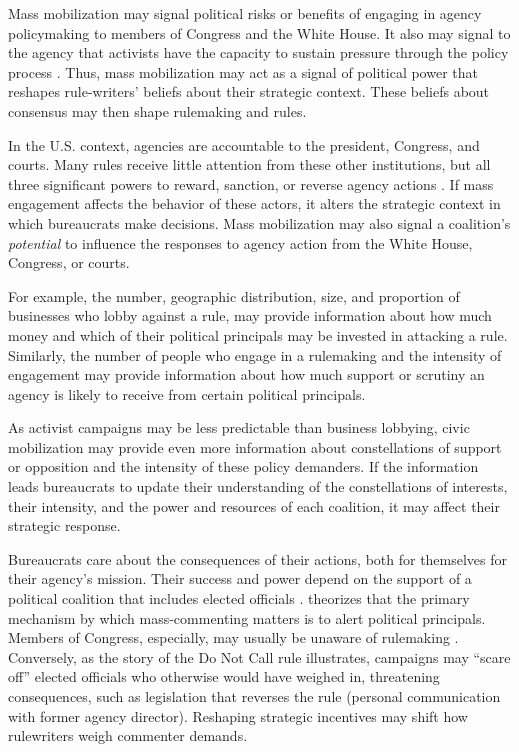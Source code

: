 Mass mobilization may signal political risks or benefits of engaging in agency policymaking to members of Congress and the White House. It also may signal to the agency that activists have the capacity to sustain pressure through the policy process \citep{Coglianese2001}.%
Thus, mass mobilization may act as a signal of political power that reshapes rule-writers' beliefs about their strategic context. These beliefs about consensus may then shape rulemaking and rules.


In the U.S. context, agencies are accountable to the president, Congress, and courts. Many rules receive little attention from these other institutions, but all three significant powers to reward, sanction, or reverse agency actions \citep{Yaver2016}. If mass engagement affects the behavior of these actors, it alters the strategic context in which bureaucrats make decisions.
Mass mobilization may also signal a coalition's \textit{potential} to influence the responses to agency action from the White House, Congress, or courts. 

For example, the number, geographic distribution, size, and proportion of businesses who lobby against a rule, may provide information about how much money and which of their political principals may be invested in attacking a rule. Similarly, the number of people who engage in a rulemaking and the intensity of engagement may provide information about how much support or scrutiny an agency is likely to receive from certain political principals. 

As activist campaigns may be less predictable than business lobbying, civic mobilization may provide even more information about constellations of support or opposition and the intensity of these policy demanders. 
If the information leads bureaucrats to update their understanding of the constellations of interests, their intensity, and the power and resources of each coalition, it may affect their strategic response.

Bureaucrats care about the consequences of their actions, both for themselves for their agency’s mission. Their success and power depend on the support of a political coalition that includes elected officials \citep{Carpenter2001}. \citet{West2004} theorizes that the primary mechanism by which mass-commenting matters is to alert political principals. Members of Congress, especially, may usually be unaware of rulemaking \citep{Nou2016}. Conversely, as the story of the Do Not Call rule illustrates, campaigns may ``scare off'' elected officials who otherwise would have weighed in, threatening consequences, such as legislation that reverses the rule (personal communication with former agency director).
Reshaping strategic incentives may shift how rulewriters weigh commenter demands.




